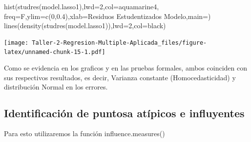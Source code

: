 \documentclass[
]{article}
\newenvironment{Shaded}{\begin{snugshade}}{\end{snugshade}}
\newcommand{\AttributeTok}[1]{\textcolor[rgb]{0.77,0.63,0.00}{#1}}
\newcommand{\DecValTok}[1]{\textcolor[rgb]{0.00,0.00,0.81}{#1}}
\newcommand{\FloatTok}[1]{\textcolor[rgb]{0.00,0.00,0.81}{#1}}
\newcommand{\FunctionTok}[1]{\textcolor[rgb]{0.00,0.00,0.00}{#1}}
\newcommand{\NormalTok}[1]{#1}
\newcommand{\SpecialCharTok}[1]{\textcolor[rgb]{0.00,0.00,0.00}{#1}}
\newcommand{\StringTok}[1]{\textcolor[rgb]{0.31,0.60,0.02}{#1}}
\begin{document}
\begin{Shaded}
\begin{Highlighting}[]
\FunctionTok{hist}\NormalTok{(}\FunctionTok{studres}\NormalTok{(model.lasso1),}\AttributeTok{lwd=}\DecValTok{2}\NormalTok{,}\AttributeTok{col=}\StringTok{\textquotesingle{}aquamarine4\textquotesingle{}}\NormalTok{,}
\AttributeTok{freq=}\NormalTok{F,}\AttributeTok{ylim=}\FunctionTok{c}\NormalTok{(}\DecValTok{0}\NormalTok{,}\FloatTok{0.4}\NormalTok{),}\AttributeTok{xlab=}\StringTok{\textquotesingle{}Residuos Estudentizados Modelo\textquotesingle{}}\NormalTok{,}\AttributeTok{main=}\StringTok{\textquotesingle{}\textquotesingle{}}\NormalTok{)}
\FunctionTok{lines}\NormalTok{(}\FunctionTok{density}\NormalTok{(}\FunctionTok{studres}\NormalTok{(model.lasso1)),}\AttributeTok{lwd=}\DecValTok{2}\NormalTok{,}\AttributeTok{col=}\StringTok{\textquotesingle{}black\textquotesingle{}}\NormalTok{)}
\end{Highlighting}
\end{Shaded}

\texttt{[image: Taller-2-Regresion-Multiple-Aplicada\_files/figure-latex/unnamed-chunk-15-1.pdf]}

Como se evidencia en los graficos y en las pruebas formales, ambos
coinciden con sus respectivos resultados, es decir, Varianza constante
(Homocedasticidad) y distribución Normal en los errores.

\hypertarget{identificaciuxf3n-de-puntosa-atuxedpicos-e-influyentes}{%
\subsection{Identificación de puntosa atípicos e
influyentes}\label{identificaciuxf3n-de-puntosa-atuxedpicos-e-influyentes}}

Para esto utilizaremos la función influence.measures()

\begin{Shaded}
\end{Shaded}
\end{document}
